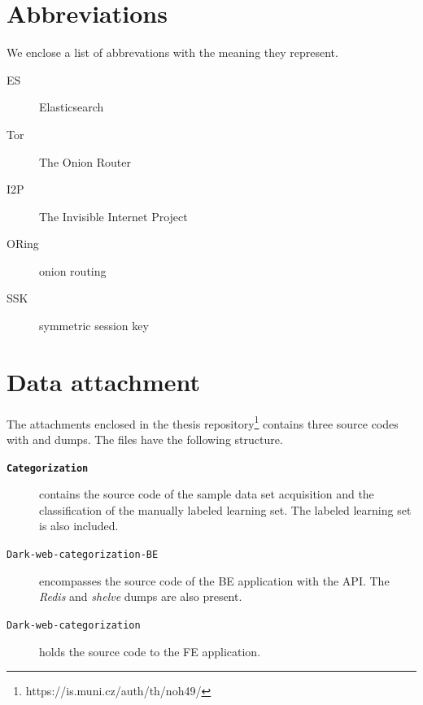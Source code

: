 \appendixpageoff
\begin{appendices}

\chapter{Abbreviations}
We enclose a list of abbrevations with the meaning they represent.
\begin{description}
    \item[ES] Elasticsearch
    \item[Tor] The Onion Router
    \item[I2P] The Invisible Internet Project
    \item[ORing] onion routing
    \item[SSK] symmetric session key
    \item[]
    \item[]
    \item[]
    \item[]
    \item[]
    \item[]
    \item[]
    \item[]
    \item[]
    \item[]
    \item[]
    \item[]
    \item[]
    \item[]
    \item[]
    \item[]
    \item[]
    \item[]
    \item[]
    \item[]
\end{description}

\chapter{Data attachment}
The attachments enclosed in the thesis repository\footnote{https://is.muni.cz/auth/th/noh49/} contains three source codes with and dumps. The files have the following structure.
\begin{description}
    \item[\textbf{\texttt{Categorization}}] contains the source code of the sample data set acquisition and the classification of the manually labeled learning set. The labeled learning set is also included.
    \item [\texttt{Dark-web-categorization-BE}] encompasses the source code of the BE application with the API. The \textit{Redis} and \textit{shelve} dumps are also present.
    \item [\texttt{Dark-web-categorization}] holds the source code to the FE application. 
\end{description}




\end{appendices}
